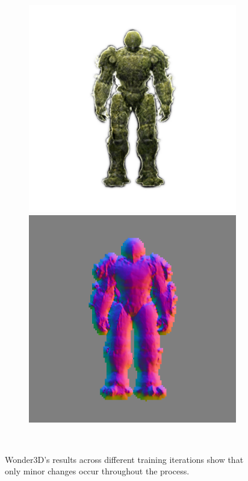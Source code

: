 \begin{figure}[H]
\begin{subfigure}[b]{0.18\textwidth}
        \caption{}
    \end{subfigure}
    \begin{subfigure}[b]{0.18\textwidth}
        \centering
        \fontsize{9pt}{7pt}\selectfont{}
        \includegraphics[width=\textwidth]{figures/generationProcess/wonder3D_10000_front_part2}
        \includegraphics[width=\textwidth]{figures/generationProcess/wonder3D_10000_front_part4}
        \caption{}
    \end{subfigure}
    \caption{Wonder3D's results across different training iterations show that only minor changes occur throughout the process.}~\label{fig:generationWonder3D}
  \end{figure}
